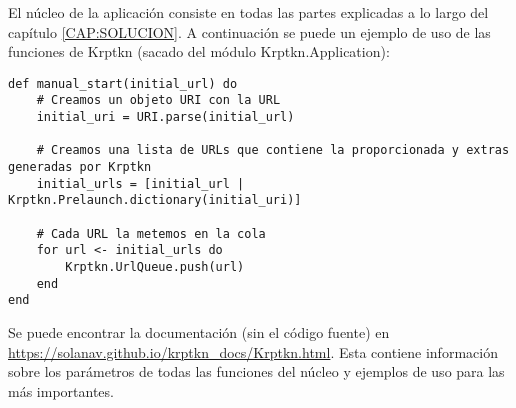 El núcleo de la aplicación consiste en todas las partes explicadas a lo largo del capítulo \ref{CAP:SOLUCION}. A continuación se puede un ejemplo de uso de las funciones de Krptkn (sacado del módulo Krptkn.Application):

\begin{verbatim}
def manual_start(initial_url) do
    # Creamos un objeto URI con la URL
    initial_uri = URI.parse(initial_url)
    
    # Creamos una lista de URLs que contiene la proporcionada y extras generadas por Krptkn
    initial_urls = [initial_url | Krptkn.Prelaunch.dictionary(initial_uri)]

    # Cada URL la metemos en la cola
    for url <- initial_urls do
        Krptkn.UrlQueue.push(url)
    end
end
\end{verbatim}

Se puede encontrar la documentación (sin el código fuente) en \url{https://solanav.github.io/krptkn_docs/Krptkn.html}. Esta contiene información sobre los parámetros de todas las funciones del núcleo y ejemplos de uso para las más importantes.